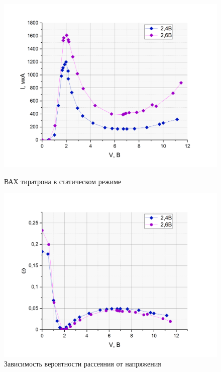 \documentclass[a4paper, 12pt]{article}
\begin{document}
\begin{figure}[h!] %
\begin{center}
\begin{minipage}[h]{0.49\linewidth}
\includegraphics[width=1\linewidth]{Рамзауэр.PNG}
\caption{ВАХ тиратрона в статическом режиме} %
\label{ris:experimoriginal} %
\end{minipage}
\hfill 
\begin{minipage}[h]{0.49\linewidth}
\includegraphics[width=1\linewidth]{w.PNG}
\caption{Зависимость вероятности рассеяния от напряжения}
\label{ris:experimcoded}
\end{minipage}
\end{center}
\end{figure}
\end{document}
